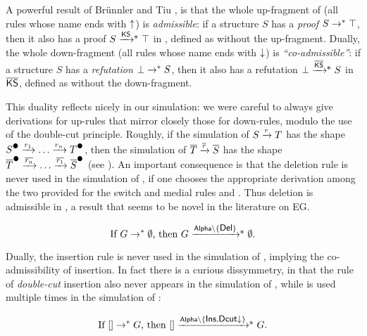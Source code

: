 A powerful result of Brünnler and Tiu \cite{brunnler_local_2001}, is that the
whole up-fragment of  (all rules whose name ends with $\uparrow$) is
\emph{admissible}: if a structure $S$ has a \emph{proof} $S \rightarrow^\ast \top$, then
it also has a proof $S \xsteps{\msys{KS}} \top$ in , defined as
 without the up-fragment.
Dually, the whole down-fragment (all rules whose name ends with $\downarrow$) is
\emph{``co-admissible''}: if a structure $S$ has a \emph{refutation} $\bot
\rightarrow^\ast S$, then it also has a refutation $\bot \xsteps{\dmdual{\msys{KS}}} S$
in $\dmdual{\msys{KS}}$, defined as  without the down-fragment.

This duality reflects nicely in our simulation: we were careful to always give
derivations for up-rules that mirror closely those for down-rules, modulo the
use of the double-cut principle. Roughly, if the simulation of $S \xrightarrow{r} T$
has the shape $\strans{S} \xstep{r_1} \ldots \xstep{r_n} \strans{T}$, then the
simulation of $\overline{T} \xrightarrow{\overline{r}} \overline{S}$ has the shape
$\strans{\dmdual{T}} \xstep{\dmdual{r_n}} \ldots \xstep{\dmdual{r_1}}
\strans{\dmdual{S}}$ (see ). An important consequence is
that the deletion rule  is never used in the simulation of , if
one chooses the appropriate derivation among the two provided for the switch and
medial rules  and . Thus deletion is admissible in , a
result that seems to be novel in the literature on EG.

\begin{corollary}\label{cor:adm-era}
  $$
  \text{If $G \steps \emptyset$, then $G \xsteps{\msys{Alpha}\setminus\{\rsf{Del}\}}
  \emptyset$.}
  $$
\end{corollary}

Dually, the insertion rule  is never used in the simulation of
, implying the co-admissibility of insertion. In fact there is
a curious dissymmetry, in that the rule  of \emph{double-cut}
insertion also never appears in the simulation of , while
 is used multiple times in the simulation of :

\begin{corollary}\label{cor:adm-ins}
  $$
  \text{If $[] \steps G$, then $[]
  \xsteps{\msys{Alpha}\setminus\{\rsf{Ins},\rsf{Dcut{\da}}\}} G$.}
  $$
\end{corollary}

